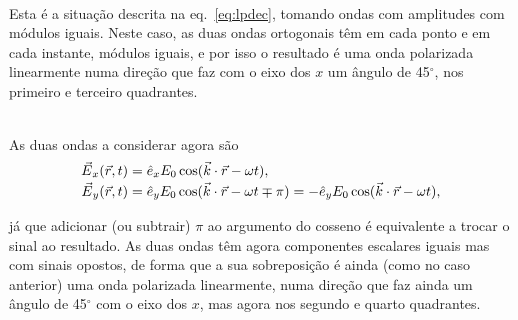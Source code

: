 \begin{description}[leftmargin=0pt,labelindent=0pt]
\item[\textbf{Caso 1, $\bm{\delta \varphi=0}$}]\hfill\\
\begin{minipage}[t]{0.85\linewidth}
Esta é a situação descrita na eq.~\eqref{eq:lpdec}, tomando ondas com amplitudes
com módulos iguais. Neste caso, as duas ondas ortogonais têm em cada ponto e em
cada instante, módulos iguais, e por isso o resultado é uma onda polarizada
linearmente numa direção que faz com o eixo dos $x$ um ângulo de 45$^\circ$, nos
primeiro e terceiro quadrantes.
\end{minipage}\hfill
{}

\item[\textbf{Caso 2, $\bm{\delta\varphi=\pm\pi}$}]\hfill\\
As duas ondas a considerar agora são
\begin{align*}
\vec E_x(\vec r,t)&=\he_x E_0\cos(\vec k\cdot\vec r-\omega t),\\
\vec E_y(\vec r,t)&=\he_y E_0\cos(\vec k\cdot\vec r-\omega t \mp \pi)=
-\he_y E_0\cos(\vec k\cdot\vec r-\omega t),
\end{align*}
\begin{minipage}[t]{0.85\linewidth}
já que adicionar (ou subtrair) $\pi$ ao argumento do cosseno é equivalente a
trocar o sinal ao resultado. As duas ondas têm agora componentes escalares
iguais mas com sinais opostos, de forma que a sua sobreposição é ainda (como no
caso anterior) uma onda polarizada linearmente, numa direção que faz
ainda um ângulo de 45$^\circ$ com o eixo dos $x$, mas agora nos segundo e quarto
quadrantes.
\end{minipage}\hfill
{}


\end{description}
